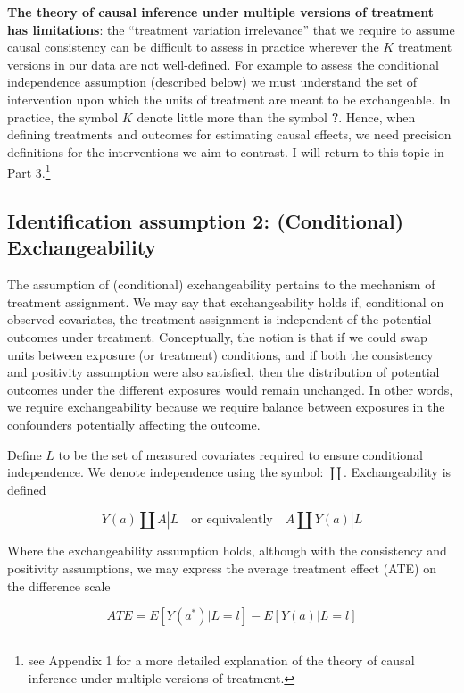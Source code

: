 \documentclass[
  singlecolumn]{report}
\begin{document}
\textbf{The theory of causal inference under multiple versions of
treatment has limitations}: the ``treatment variation irrelevance'' that
we require to assume causal consistency can be difficult to assess in
practice wherever the \(K\) treatment versions in our data are not
well-defined. For example to assess the conditional independence
assumption (described below) we must understand the set of intervention
upon which the units of treatment are meant to be exchangeable. In
practice, the symbol \(K\) denote little more than the symbol
\textbf{?}️. Hence, when defining treatments and outcomes for estimating
causal effects, we need precision definitions for the interventions we
aim to contrast. I will return to this topic in Part 3.\footnote{see
  Appendix 1 for a more detailed explanation of the theory of causal
  inference under multiple versions of treatment.}

\hypertarget{identification-assumption-2-conditional-exchangeability}{%
\subsection{Identification assumption 2: (Conditional)
Exchangeability}\label{identification-assumption-2-conditional-exchangeability}}

The assumption of (conditional) exchangeability pertains to the
mechanism of treatment assignment. We may say that exchangeability holds
if, conditional on observed covariates, the treatment assignment is
independent of the potential outcomes under treatment. Conceptually, the
notion is that if we could swap units between exposure (or treatment)
conditions, and if both the consistency and positivity assumption were
also satisfied, then the distribution of potential outcomes under the
different exposures would remain unchanged. In other words, we require
exchangeability because we require balance between exposures in the
confounders potentially affecting the outcome.

Define \(L\) to be the set of measured covariates required to ensure
conditional independence. We denote independence using the symbol:
\(\coprod\). Exchangeability is defined

\[
Y(a) \coprod  A|L \quad \text{or equivalently} \quad A \coprod  Y(a)|L
\]

Where the exchangeability assumption holds, although with the
consistency and positivity assumptions, we may express the average
treatment effect (ATE) on the difference scale

\[
ATE = E[Y(a^*)|L = l] - E[Y(a)|L = l]
\]
\end{document}
